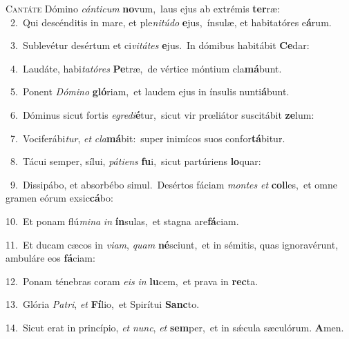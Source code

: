 \lettrine{\initial\textcolor{\initialcolor}{C}}{antáte} Dómino \textit{cán}\-\textit{ti}\textit{cum} \textbf{no}\-vum,~\star laus ejus ab extrémis \textbf{ter}\-ræ:\\
{\numbfont\textcolor{\numbcolor}{~2.}}~Qui descénditis in mare, et ple\-\textit{ni}\-\textit{tú}\textit{do} \textbf{e}\-jus,~\star ínsulæ, et habitatóres e\-\textbf{á}\-rum.\par
{\numbfont\textcolor{\numbcolor}{~3.}}~Sublevétur desértum et ci\-\textit{vi}\-\textit{tá}\textit{tes} \textbf{e}\-jus.~\star In dómibus habitábit \textbf{Ce}\-dar:\par
{\numbfont\textcolor{\numbcolor}{~4.}}~Laudáte, habi\-\textit{ta}\-\textit{tó}\textit{res} \textbf{Pe}\-træ,~\star de vértice móntium cla\-\textbf{má}\-bunt.\par
{\numbfont\textcolor{\numbcolor}{~5.}}~Ponent \textit{Dó}\-\textit{mi}\textit{no} \textbf{gló}\-riam,~\star et laudem ejus in ínsulis nunti\-\textbf{á}\-bunt.\par
{\numbfont\textcolor{\numbcolor}{~6.}}~Dóminus sicut fortis \textit{e}\-\textit{gre}\textit{di}\textbf{é}tur,~\star sicut vir prœliátor suscitábit \textbf{ze}\-lum:\par
{\numbfont\textcolor{\numbcolor}{~7.}}~Vociferábi\-\textit{tur}\-, \textit{et} \textit{cla}\-\textbf{má}bit:~\star super inimícos suos confor\-\textbf{tá}\-bitur.\par
{\numbfont\textcolor{\numbcolor}{~8.}}~Tácui semper, sílui, \textit{pá}\-\textit{ti}\textit{ens} \textbf{fu}\-i,~\star sicut partúriens \textbf{lo}\-quar:\par
{\numbfont\textcolor{\numbcolor}{~9.}}~Dissipábo, et absorbébo simul.~\dagger Desértos fáciam \textit{mon}\-\textit{tes} \textit{et} \textbf{col}\-les,~\star et omne gramen eórum exsic\-\textbf{cá}\-bo:\par
{\numbfont\textcolor{\numbcolor}{10.}}~Et ponam flú\-\textit{mi}\-\textit{na} \textit{in} \textbf{ín}\-sulas,~\star et stagna are\-\textbf{fá}\-ciam.\par
{\numbfont\textcolor{\numbcolor}{11.}}~Et ducam cæcos in \textit{vi}\-\textit{am}, \textit{quam} \textbf{né}\-sciunt,~\star et in sémitis, quas ignoravérunt, ambuláre eos \textbf{fá}\-ciam:\par
{\numbfont\textcolor{\numbcolor}{12.}}~Ponam ténebras coram \textit{e}\-\textit{is} \textit{in} \textbf{lu}\-cem,~\star et prava in \textbf{rec}\-ta.\par
{\numbfont\textcolor{\numbcolor}{13.}}~Glória \textit{Pa}\-\textit{tri}, \textit{et} \textbf{Fí}\-lio,~\star et Spirítui \textbf{Sanc}\-to.\par
{\numbfont\textcolor{\numbcolor}{14.}}~Sicut erat in princípio, \textit{et} \textit{nunc}\-, \textit{et} \textbf{sem}\-per,~\star et in sǽcula sæculórum. \textbf{A}\-men.\par
